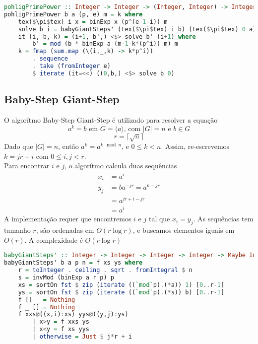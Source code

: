 \documentclass{article}
\begin{document}
\noindent\hspace{0.03\linewidth}
\begin{minipage}{.9\linewidth}
\begin{lstlisting}[language=haskell,caption=Pohlig Prime Power]
pohligPrimePower :: Integer -> Integer -> (Integer, Integer) -> Integer -> Maybe Integer
pohligPrimePower b a (p, e) m = k where
    tex($\pi$tex) i x = binExp x (p^(e-1-i)) m
    solve b i = babyGiantSteps' (tex($\pi$tex) i b) (tex($\pi$tex) 0 a) m p
    it (i, b, k) = (i+1, b',) <$> solve b' (i+1) where
        b' = mod (b * binExp a (m-1-k*(p^i)) m) m
    k = fmap (sum.map (\(i,_,k) -> k*p^i))
        . sequence
        . take (fromInteger e)
        $ iterate (it=<<) ((0,b,) <$> solve b 0)
\end{lstlisting}
\end{minipage}

\subsection{Baby-Step Giant-Step}
O algorítmo Baby-Step Giant-Step é utilizado para resolver a equação
$$ a^k = b \text{ em } G = \langle a \rangle\text{, com }|G| = n\text{ e }b \in G$$
$$ r = \lceil \sqrt{n} \rceil $$
Dado que $ |G| = n $, então $ a^k = a^{k \mod n} $, e $ 0 \leq k < n $. Assim, re-escrevemos $ k = j r + i $ com $ 0 \leq i, j < r $.\\
Para encontrar $i$ e $j$, o algorítmo calcula duas sequências
\begin{align*}
    x_i &= a^i\\
    y_j &= b a^{-j r} = a^{k - j r}\\
        &= a^{j r + i - j r}\\
        &= a^{i}
\end{align*}
A implementação requer que encontremos $i$ e $j$ tal que $x_i = y_j$. As sequências tem tamanho $r$, são ordenadas em $O(r \log r)$, e buscamos elementos iguais em $O(r)$. A complexidade é $O(r \log r)$

\noindent\hspace{0.03\linewidth}
\begin{minipage}{.9\linewidth}
\begin{lstlisting}[language=haskell,caption=Baby-Steps Giant-Steps]
babyGiantSteps' :: Integer -> Integer -> Integer -> Integer -> Maybe Integer
babyGiantSteps' b a p n = f xs ys where
    r = toInteger . ceiling . sqrt . fromIntegral $ n
    s = invMod (binExp a r p) p
    xs = sortOn fst $ zip (iterate ((`mod`p).(*a)) 1) [0..r-1]
    ys = sortOn fst $ zip (iterate ((`mod`p).(*s)) b) [0..r-1]
    f [] _ = Nothing
    f _ [] = Nothing
    f xxs@((x,i):xs) yys@((y,j):ys)
        | x>y = f xxs ys
        | x<y = f xs yys
        | otherwise = Just $ j*r + i
\end{lstlisting}
\end{minipage}
\end{document}
